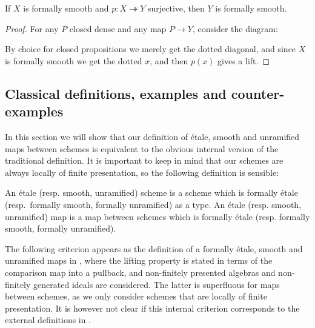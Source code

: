 \begin{proposition}\label{smoothSurjective}
If $X$ is formally smooth and $p:X\twoheadrightarrow Y$ surjective, then $Y$ is formally smooth.
\end{proposition}

\begin{proof}
For any $P$ closed dense and any map $P\to Y$, consider the diagram:
 \begin{center}
    \end{center} 
    By choice for closed propositions we merely get the dotted diagonal, and since $X$ is formally smooth we get the dotted $x$, and then $p(x)$ gives a lift.
\end{proof}


\subsection{Classical definitions, examples and counter-examples}

In this section we will show that our definition of étale, smooth and unramified maps between schemes is equivalent to the obvious internal version of the traditional definition. It is important to keep in mind that our schemes are always locally of finite presentation, so the following definition is sensible:

\begin{definition}
  An étale (resp. smooth, unramified) scheme is a scheme which is formally étale (resp.\ formally smooth, formally unramified) as a type.
  An étale (resp. smooth, unramified) map is a map between schemes which is formally étale (resp. formally smooth, formally unramified).
\end{definition}

The following criterion appears as the definition of a formally étale, smooth and unramified maps in \cite[§17]{EGAIV4},
where the lifting property is stated in terms of the comparison map into a pullback, and non-finitely presented algebras and non-finitely generated ideals are considered. The latter is superfluous for maps between schemes, as we only consider schemes that are locally of finite presentation. It is however not clear if this internal criterion corresponds to the external definitions in \cite[§17]{EGAIV4}.

